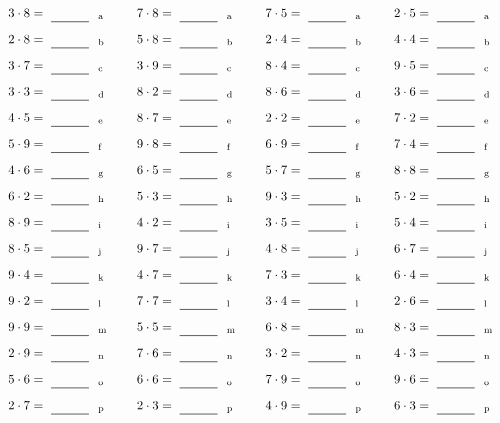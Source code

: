 \documentclass
[
  draft    = true,
  fontsize = 11pt,
  parskip  = half-
]
{scrartcl}
\begin{document}
\par\vfill\par
\begin{align*}
    \pline{3\cdot8}&=\rline{a}
  & \pline{7\cdot8}&=\rline{a}
  & \pline{7\cdot5}&=\rline{a}
  & \pline{2\cdot5}&=\rline{a} \\[1ex]
    \pline{2\cdot8}&=\rline{b}
  & \pline{5\cdot8}&=\rline{b}
  & \pline{2\cdot4}&=\rline{b}
  & \pline{4\cdot4}&=\rline{b} \\[1ex]
    \pline{3\cdot7}&=\rline{c}
  & \pline{3\cdot9}&=\rline{c}
  & \pline{8\cdot4}&=\rline{c}
  & \pline{9\cdot5}&=\rline{c} \\[1ex]
    \pline{3\cdot3}&=\rline{d}
  & \pline{8\cdot2}&=\rline{d}
  & \pline{8\cdot6}&=\rline{d}
  & \pline{3\cdot6}&=\rline{d} \\[1ex]
    \pline{4\cdot5}&=\rline{e}
  & \pline{8\cdot7}&=\rline{e}
  & \pline{2\cdot2}&=\rline{e}
  & \pline{7\cdot2}&=\rline{e} \\[1ex]
    \pline{5\cdot9}&=\rline{f}
  & \pline{9\cdot8}&=\rline{f}
  & \pline{6\cdot9}&=\rline{f}
  & \pline{7\cdot4}&=\rline{f} \\[1ex]
    \pline{4\cdot6}&=\rline{g}
  & \pline{6\cdot5}&=\rline{g}
  & \pline{5\cdot7}&=\rline{g}
  & \pline{8\cdot8}&=\rline{g} \\[1ex]
    \pline{6\cdot2}&=\rline{h}
  & \pline{5\cdot3}&=\rline{h}
  & \pline{9\cdot3}&=\rline{h}
  & \pline{5\cdot2}&=\rline{h} \\[1ex]
    \pline{8\cdot9}&=\rline{i}
  & \pline{4\cdot2}&=\rline{i}
  & \pline{3\cdot5}&=\rline{i}
  & \pline{5\cdot4}&=\rline{i} \\[1ex]
    \pline{8\cdot5}&=\rline{j}
  & \pline{9\cdot7}&=\rline{j}
  & \pline{4\cdot8}&=\rline{j}
  & \pline{6\cdot7}&=\rline{j} \\[1ex]
    \pline{9\cdot4}&=\rline{k}
  & \pline{4\cdot7}&=\rline{k}
  & \pline{7\cdot3}&=\rline{k}
  & \pline{6\cdot4}&=\rline{k} \\[1ex]
    \pline{9\cdot2}&=\rline{l}
  & \pline{7\cdot7}&=\rline{l}
  & \pline{3\cdot4}&=\rline{l}
  & \pline{2\cdot6}&=\rline{l} \\[1ex]
    \pline{9\cdot9}&=\rline{m}
  & \pline{5\cdot5}&=\rline{m}
  & \pline{6\cdot8}&=\rline{m}
  & \pline{8\cdot3}&=\rline{m} \\[1ex]
    \pline{2\cdot9}&=\rline{n}
  & \pline{7\cdot6}&=\rline{n}
  & \pline{3\cdot2}&=\rline{n}
  & \pline{4\cdot3}&=\rline{n} \\[1ex]
    \pline{5\cdot6}&=\rline{o}
  & \pline{6\cdot6}&=\rline{o}
  & \pline{7\cdot9}&=\rline{o}
  & \pline{9\cdot6}&=\rline{o} \\[1ex]
    \pline{2\cdot7}&=\rline{p}
  & \pline{2\cdot3}&=\rline{p}
  & \pline{4\cdot9}&=\rline{p}
  & \pline{6\cdot3}&=\rline{p}
\end{align*}
\end{document}

